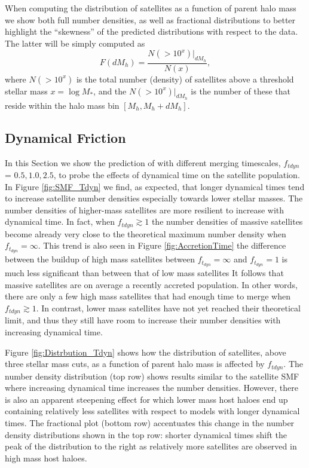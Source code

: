 When computing the distribution of satellites as a function of parent halo mass we show both full number densities, as well as fractional distributions to better highlight the ``skewness'' of the predicted distributions with respect to the data. The latter will be simply computed as
\begin{equation}
\label{eqn:FracPlot}
F(dM_h) = \frac{N(>10^x)|_{dM_h}}{N(x)},
\end{equation} 
where $N(>10^{x})$ is the total number (density) of satellites above a threshold stellar mass $x= \log M_{*}$, and the $N(>10^{x})|_{dM_h}$ is the number of these that reside within the halo mass bin $[M_h, M_h+dM_h]$. 

\subsection{Dynamical Friction}
In this Section we show the prediction of \steel with different merging timescales, $f_{tdyn}$ = $0.5, 1.0, 2.5$, to probe the effects of dynamical time on the satellite population. In Figure \ref{fig:SMF_Tdyn} we find, as expected, that longer dynamical times tend to increase satellite number densities especially towards lower stellar masses. The number densities of higher-mass satellites are more resilient to increase with dynamical time. In fact, when $f_{tdyn}\gtrsim 1$ the number densities of massive satellites become already very close to the theoretical maximum number density when  $f_{t_{dyn}} = \infty$. This trend is also seen in Figure \ref{fig:AccretionTime} the difference between the buildup of high mass satellites between $f_{t_{dyn}} = \infty$ and $f_{t_{dyn}} = 1$ is much less significant than between that of low mass satellites
It follows that massive satellites are on average a recently accreted population. In other words, there are only a few high mass satellites that had enough time to merge when $f_{tdyn}\gtrsim 1$. In contrast, lower mass satellites have not yet reached their theoretical limit, and thus they still have room to increase their number densities with increasing dynamical time.  

Figure \ref{fig:Distrbution_Tdyn} shows how the distribution of satellites, above three stellar mass cuts, as a function of parent halo mass is affected by $f_{tdyn}$. The number density distribution (top row) shows results similar to the satellite SMF where increasing dynamical time increases the number densities. However, there is also an apparent steepening effect for which lower mass host haloes end up containing relatively less satellites with respect to models with longer dynamical times. The fractional plot (bottom row) accentuates this change in the number density distributions shown in the top row: shorter dynamical times shift the peak of the distribution to the right as relatively more satellites are observed in high mass host haloes.

